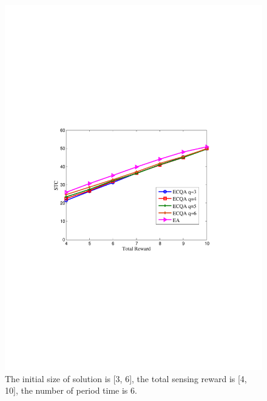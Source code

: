 \documentclass[journal]{IEEEtran}
\begin{document}
\begin{figure}[h]
	\centering
	\includegraphics[width=0.85\linewidth]{figure6.pdf}
	\caption{The initial size of solution is [3, 6], the total sensing reward is [4, 10], the number of period time is 6.}
	\label{fig:figure8}
\end{figure}
\end{document}
